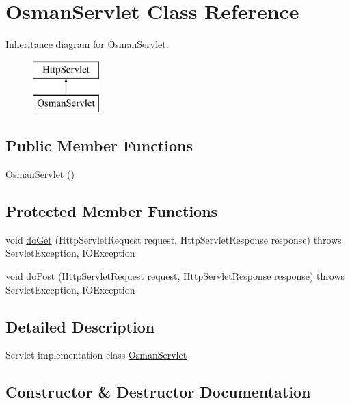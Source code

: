 \hypertarget{class_osman_servlet}{}\section{Osman\+Servlet Class Reference}
\label{class_osman_servlet}
Inheritance diagram for Osman\+Servlet\+:\begin{figure}[H]
\begin{center}
\leavevmode
\includegraphics[height=2.000000cm]{class_osman_servlet}
\end{center}
\end{figure}
\subsection*{Public Member Functions}
\begin{DoxyCompactItemize}
\item 
\hyperlink{class_osman_servlet_a01c17538feb7733f728cab3b6be93a5b}{Osman\+Servlet} ()
\end{DoxyCompactItemize}
\subsection*{Protected Member Functions}
\begin{DoxyCompactItemize}
\item 
void \hyperlink{class_osman_servlet_aafa070b4f76cd5d88a74348cbc4f9644}{do\+Get} (Http\+Servlet\+Request request, Http\+Servlet\+Response response)  throws Servlet\+Exception, I\+O\+Exception 
\item 
void \hyperlink{class_osman_servlet_a9766ba6b1e0bc1e3277b20834c61a5e2}{do\+Post} (Http\+Servlet\+Request request, Http\+Servlet\+Response response)  throws Servlet\+Exception, I\+O\+Exception 
\end{DoxyCompactItemize}


\subsection{Detailed Description}
Servlet implementation class \hyperlink{class_osman_servlet}{Osman\+Servlet} 

\subsection{Constructor \& Destructor Documentation}
\hypertarget{class_osman_servlet_a01c17538feb7733f728cab3b6be93a5b}{}
